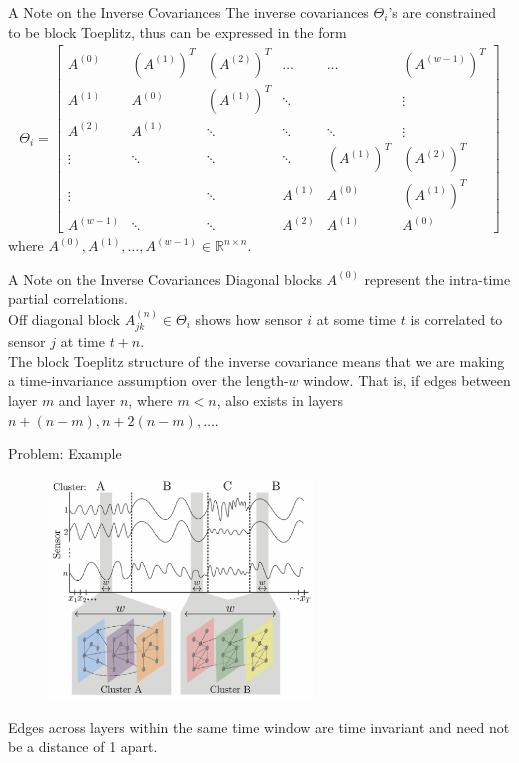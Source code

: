 \documentclass{beamer}
\begin{document}
\begin{frame}{A Note on the Inverse Covariances}
	The inverse covariances $\Theta_i$'s are constrained to be block Toeplitz, thus can be expressed in the form
	\begin{align*}
		\Theta_i = 
		\begin{bmatrix}
		A^{(0)} & (A^{(1)})^T & (A^{(2)})^T & \dots   & \dots       & (A^{(w-1)})^T \\
		A^{(1)} & A^{(0)}     & (A^{(1)})^T & \ddots  &             & \vdots        \\
		A^{(2)} & A^{(1)}     & \ddots		& \ddots  & \ddots      & \vdots        \\
		\vdots  & \ddots      & \ddots      & \ddots  & (A^{(1)})^T & (A^{(2)})^T   \\
		\vdots  &             & \ddots      & A^{(1)} & A^{(0)}     & (A^{(1)})^T   \\
		A^{(w-1)} & \ddots  & \ddots      & A^{(2)} & A^{(1)}     & A^{(0)}
		\end{bmatrix}
	\end{align*} 
	where $A^{(0)}, A^{(1)}, \dots, A^{(w-1)} \in \mathbb{R}^{n \times n}$.
\end{frame}


\begin{frame}{A Note on the Inverse Covariances}
	Diagonal blocks $A^{(0)}$ represent the intra-time partial correlations. \\
	\vspace{.5cm}
	Off diagonal block $A^{(n)}_{jk} \in \Theta_i$ shows how sensor $i$ at some time $t$ is correlated to sensor $j$ at time $t+n$. \\
	\vspace{.5cm}
	The block Toeplitz structure of the inverse covariance means that we are making a time-invariance assumption over the length-$w$ window. That is, if edges between layer $m$ and layer $n$, where $m < n$, also exists in layers $n + (n - m), n + 2(n - m), \dots$.  
\end{frame}


\begin{frame}{Problem: Example}
	\begin{figure}
		\centering
		\includegraphics[width=7cm]{fig3.eps}
	\end{figure}
	\centering
	Edges across layers within the same time window are time invariant and need not be a distance of 1 apart.
\end{frame}
\end{document}

